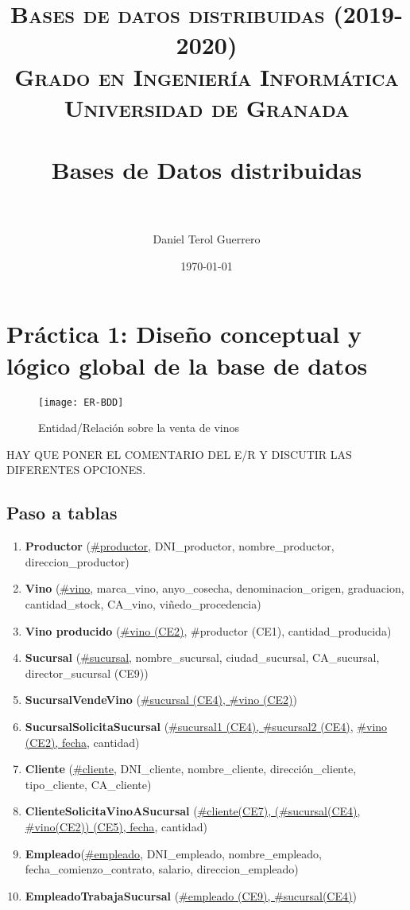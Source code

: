 \documentclass[paper=a4, fontsize=12pt]{article} %
\title{ 
\normalfont \normalsize 
\textsc{{\bf Bases de datos distribuidas (2019-2020)} \\ Grado en Ingeniería Informática \\ Universidad de Granada} \\ [25pt] %
\horrule{0.5pt} \\[0.4cm] %
\huge Bases de Datos distribuidas\\%
\horrule{2pt} \\[0.5cm] %
}
\author{Daniel Terol Guerrero\\} %
\date{\normalsize\today} %
\numberwithin{equation}{section} %
\numberwithin{figure}{section} %
\numberwithin{table}{section} %
\begin{document}
\maketitle %
\newpage %

\tableofcontents %
\newpage
{}

\section{Práctica 1: Diseño conceptual y lógico global de la base de datos}

\begin{figure}[H]
  \centering
  \texttt{[image: ER-BDD]}
  \caption{Entidad/Relación sobre la venta de vinos}
  \label{er_vinos}
\end{figure}

\large HAY QUE PONER EL COMENTARIO DEL E/R Y DISCUTIR LAS DIFERENTES OPCIONES. \\

\subsection {Paso a tablas}

\begin{enumerate}
\item \textbf{Productor} (\underline{\#productor}, DNI\_productor, nombre\_productor, direccion\_productor)
\item \textbf{Vino} (\underline{\#vino}, marca\_vino, anyo\_cosecha, denominacion\_origen, graduacion,  cantidad\_stock, CA\_vino, viñedo\_procedencia)
\item \textbf{Vino producido} (\underline{\#vino (CE2)}, \#productor (CE1), cantidad\_producida)
\item \textbf{Sucursal} (\underline{\#sucursal}, nombre\_sucursal, ciudad\_sucursal, CA\_sucursal, director\_sucursal (CE9))
\item \textbf{SucursalVendeVino} (\underline{\#sucursal (CE4), \#vino (CE2)})
\item \textbf{SucursalSolicitaSucursal} (\underline{\#sucursal1 (CE4), \#sucursal2 (CE4)}, \underline{\#vino (CE2), fecha}, cantidad)
\item \textbf{Cliente} (\underline{\#cliente}, DNI\_cliente, nombre\_cliente, dirección\_cliente, tipo\_cliente, CA\_cliente)
\item \textbf{ClienteSolicitaVinoASucursal} (\underline{\#cliente(CE7), (\#sucursal(CE4)}, \underline{\#vino(CE2)) (CE5), fecha}, cantidad)
\item \textbf{Empleado}(\underline{\#empleado}, DNI\_empleado, nombre\_empleado, fecha\_comienzo\_contrato, salario, direccion\_empleado)
\item \textbf{EmpleadoTrabajaSucursal} (\underline{\#empleado (CE9), \#sucursal(CE4)})
\end{enumerate}
\end{document}
